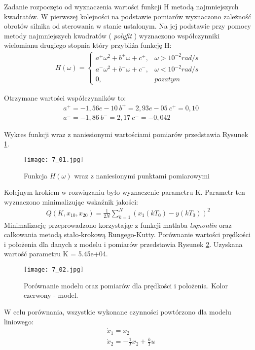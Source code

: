 \documentclass[a4paper,15pt]{article}
\begin{document}
Zadanie rozpoczęto od wyznaczenia wartości funkcji H metodą najmniejszych kwadratów. W pierwszej kolejności na podstawie pomiarów wyznaczono zależność obrotów silnika od sterowania w stanie ustalonym. Na jej podstawie przy pomocy metody najmniejszych kwadratów ( \textit{polyfit} ) wyznaczono współczynniki wielomianu drugiego stopnia który przybliża funkcję H:
\begin{align*}
H(\omega) = 
\begin{cases}
a^+\omega^2 + b^+\omega + c^+, & \omega>10^{-2}rad/s \\
a^-\omega^2 + b^-\omega + c^-, & \omega<10^{-2}rad/s \\
0, & poza tym
\end{cases}
\end{align*}

Otrzymane wartości współczynników to:
\begin{align*}
& a^+ = -1,56e-10 \	b^+ = 2,93e-05	\ c^+ = 0,10 \\
& a^- = -1,86	\ b^- = 2,17 \ c^- = -0,042
\end{align*}

Wykres funkcji wraz z naniesionymi wartościami pomiarów przedstawia Rysunek \ref{fig:7_01}.


\begin{figure}[H]
\centerline{\texttt{[image: 7\_01.jpg]}}
\centering
\caption{Funkcja \( H(\omega) \) wraz z naniesionymi punktami pomiarowymi}
\label{fig:7_01}
\end{figure}

Kolejnym krokiem w rozwiązaniu było wyznaczenie parametru K. Parametr ten wyznaczono minimalizując wskaźnik jakości:
\begin{align*}
Q(K,x_{10},x_{20}) = \frac{1}{2N}\sum _{k=1}^N(x_1(kT_0)-y(kT_0))^2
\end{align*}
Minimalizację przeprowadzono korzystając z funkcji matlaba \textit{lsqnonlin} oraz całkowania metodą stało-krokową Rungego-Kutty. Porównanie wartości prędkości i położenia dla danych z modelu i pomiarów przedstawia Rysunek \ref{fig:7_02}. Uzyskana wartość parametru K = 5.45e+04.

\begin{figure}[H]
\centerline{\texttt{[image: 7\_02.jpg]}}
\centering
\caption{Porównanie modelu oraz pomiarów dla prędkości i położenia. Kolor czerwony - model.}
\label{fig:7_02}
\end{figure}

W celu porównania, wszystkie wykonane czynności powtórzono dla modelu liniowego:
\begin{align*}
& \dot{x}_1 = x_2 \\
& \dot{x}_2 = -\frac{1}{T}x_2+\frac{k}{T}u
\end{align*}
\end{document}
